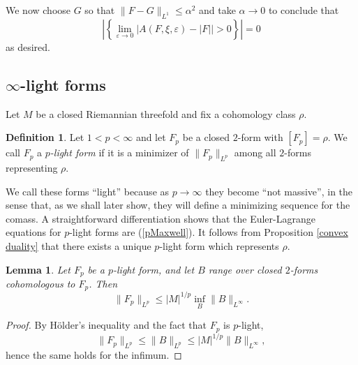 \documentclass[reqno,11pt]{amsart}
\newcommand{\RR}{\mathbf{R}}
\newcommand{\dfn}[1]{\emph{#1}\index{#1}}
\newtheorem{lemma}[theorem]{Lemma}
\theoremstyle{definition}
\newtheorem{definition}[theorem]{Definition}
\numberwithin{equation}{section}
\begin{document}
We now choose $G$ so that $\|F - G\|_{L^1} \leq \alpha^2$ and take $\alpha \to 0$ to conclude that
$$\left|\left\{\lim_{\varepsilon \to 0} |A(F, \xi, \varepsilon) - |F|| > 0\right\}\right| = 0$$
as desired.

\subsection{\texorpdfstring{$\infty$-light forms}{Infinity-light forms}}
Let $M$ be a closed Riemannian threefold and fix a cohomology class $\rho$.

\begin{definition}
Let $1 < p < \infty$ and let $F_p$ be a closed $2$-form with $[F_p] = \rho$.
We call $F_p$ a \dfn{$p$-light form} if it is a minimizer of $\|F_p\|_{L^p}$ among all $2$-forms representing $\rho$.
\end{definition}

We call these forms ``light'' because as $p \to \infty$ they become ``not massive'', in the sense that, as we shall later show, they will define a minimizing sequence for the comass.
A straightforward differentiation shows that the Euler-Lagrange equations for $p$-light forms are (\ref{pMaxwell}).
It follows from Proposition \ref{convex duality} that there exists a unique $p$-light form which represents $\rho$.

\begin{lemma}
Let $F_p$ be a $p$-light form, and let $B$ range over closed $2$-forms cohomologous to $F_p$. Then
\begin{equation}\label{infinity magnetic rules p magnetic}
	\|F_p\|_{L^p} \leq |M|^{1/p} \inf_B \|B\|_{L^\infty}.
\end{equation}
\end{lemma}
\begin{proof}
By H\"older's inequality and the fact that $F_p$ is $p$-light,
$$\|F_p\|_{L^p} \leq \|B\|_{L^p} \leq |M|^{1/p} \|B\|_{L^\infty},$$
hence the same holds for the infimum.
\end{proof}

\end{document}
